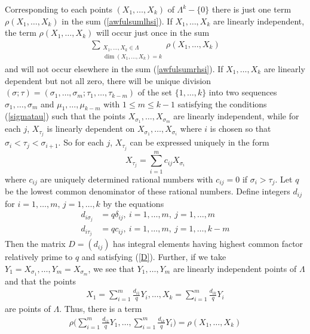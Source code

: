 \documentclass[11pt]{article}
\theoremstyle{definition}
\theoremstyle{proof}
\begin{document}
Corresponding to each points $(X_1, \ldots, X_k)$ of $\Lambda ^k -\{0\}$ there is just one term $\rho(X_1, \ldots, X_k)$ in the sum (\ref{awfulsumlhsi}).
If $X_1, \ldots, X_k$ are linearly independent, the term $\rho(X_1, \ldots, X_k)$ will occur just once in the sum
\begin{align}\label{Xsindep}
    \sum_{\substack{X_1, \ldots, X_k \in \Lambda  \\ \dim (X_1, \ldots, X_k) = k}} \rho(X_1, \ldots, X_k)
\end{align}
and will not occur elsewhere in the sum (\ref{awfulsumrhsi}).
If $X_1, \ldots, X_k$ are linearly dependent but not all zero, there will be unique division $(\sigma ; \tau ) = (\sigma _1, \ldots, \sigma _m; \tau _1, \ldots, \tau _{k-m})$ of the set $\{1, \ldots, k\}$ into two sequences $\sigma _1, \ldots, \sigma _m$ and $\mu _1, \ldots, \mu _{k-m}$ with $1\leq m \leq k-1$ satisfying the conditions (\ref{sigmatau}) such that the points $X_{\sigma _1}, \ldots, X_{\sigma _m}$ are linearly independent, while for each $j$, $X_{\tau _j}$ is linearly dependent on $X_{\sigma _1}, \ldots, X_{\sigma _i}$ where $i$ is chosen so that $\sigma _i < \tau _j < \sigma _{i+1}$.
So for each $j$, $X_{\tau _j}$ can be expressed uniquely in the form
\[
    X_{\tau _j} = \sum_{i=1}^{m}c_{ij}X_{\sigma _i}
\]
where $c_{ij}$ are uniquely determined rational numbers with $c_{ij}= 0$ if $\sigma _i > \tau _j$.
Let $q$ be the lowest common denominator of these rational numbers.
Define integers $d_{ij}$ for $i = 1, \ldots, m, \, j = 1, \ldots, k$ by the equations
\begin{align*}
    d_{i \sigma _j} &= q \delta _{ij}, \ i=1, \ldots, m, \ j = 1, \ldots, m \\
    d_{i \tau _j} &= q c_{ij}, \ i=1, \ldots, m, \ j=1, \ldots, k-m
\end{align*}
Then the matrix $D=(d_{ij})$ has integral elements having highest common factor relatively prime to $q$ and satisfying (\ref{D}).
Further, if we take $Y_1 = X_{\sigma _1}, \ldots, Y_m=X_{\sigma _m}$, we see that $Y_1, \ldots, Y_m$ are linearly independent points of $\Lambda$ and that the points
\begin{align}\label{Xs}
    X_1= \sum_{i=1}^{m}\frac{d_{i1}}{q}Y_i, \ldots, X_k= \sum_{i=1}^{m}\frac{d_{ik}}{q}Y_i
\end{align}
are points of $\Lambda$.
Thus, there is a term
\begin{align}\label{Xsdep}
    \rho\bigg(\sum_{i=1}^{m}\frac{d_{i1}}{q}Y_1, \ldots, \sum_{i=1}^{m}\frac{d_{ik}}{q}Y_i\bigg) = \rho(X_1, \ldots, X_k)
\end{align}
\end{document}
